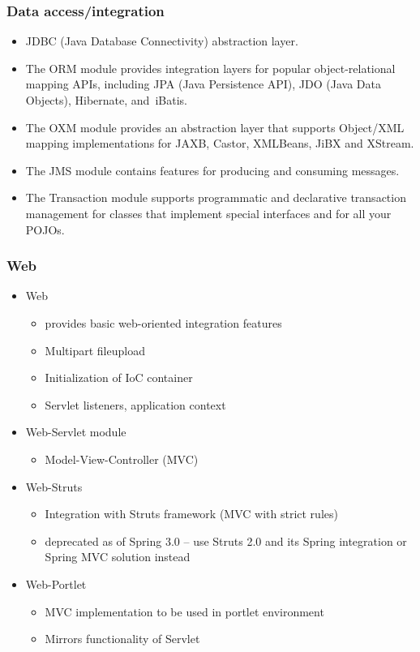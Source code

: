 \documentclass[10pt,xcolor=pdflatex, table]{beamer}
\begin{document}
\begin{frame}\frametitle{Data access/integration}
	\begin{itemize}
		\item JDBC (Java Database Connectivity) abstraction layer.
		\item The ORM module provides integration layers for popular object-relational mapping APIs, including JPA (Java Persistence API), JDO (Java Data Objects), Hibernate, and~iBatis.
		\item The OXM module provides an abstraction layer that supports Object/XML mapping implementations for JAXB, Castor, XMLBeans, JiBX and XStream.
		\item The JMS module contains features for producing and consuming messages.
		\item The Transaction module supports programmatic and declarative transaction management for classes that implement special interfaces and for all your POJOs.
	\end{itemize}
\end{frame}


\begin{frame}\frametitle{Web}
	\begin{itemize}
		\item Web
          \begin{itemize}
            \item provides basic web-oriented integration features
        	\item Multipart fileupload
        	\item Initialization of IoC container
        	\item Servlet listeners, application context
          \end{itemize}
		\item Web-Servlet module
          \begin{itemize}
        	\item Model-View-Controller (MVC)
          \end{itemize}
		\item Web-Struts
          \begin{itemize}
        	\item Integration with Struts framework (MVC with strict rules)
        	\item deprecated as of Spring 3.0 -- use Struts 2.0 and its Spring integration or Spring MVC solution instead
          \end{itemize}
        \item Web-Portlet
          \begin{itemize}
        	\item MVC implementation to be used in portlet environment
        	\item Mirrors functionality of Servlet
          \end{itemize}
	\end{itemize}
\end{frame}
\end{document}
